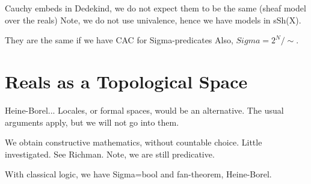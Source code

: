 Cauchy embeds in Dedekind, we do not expect them to be the same (sheaf model over the
reals) Note, we do not use univalence, hence we have models in sSh(X).

They are the same if we have CAC for Sigma-predicates
Also, $Sigma = 2^N/\sim$.


\section{Reals as a Topological Space}
\label{sec:reals-as-topological}

Heine-Borel... Locales, or formal spaces, would be an alternative. The usual arguments
apply, but we will not go into them.

We obtain constructive mathematics, without countable choice. Little investigated.
See Richman. Note, we are still predicative.

With classical logic, we have Sigma=bool and fan-theorem, Heine-Borel.



